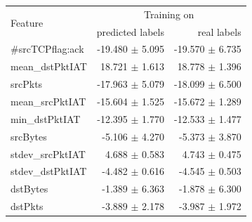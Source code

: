 \documentclass[10pt,sigconf,letterpaper]{acmart}
\begin{document}
\begin{table}
\begin{tabular}{l r r}
\bottomrule
\end{tabular} \qquad
 \begin{tabular}{l r r} \toprule 
\multirow{2}{*}{Feature} & \multicolumn{2}{c}{Training on} \\
  & predicted labels & real labels \\ \midrule
    \#srcTCPflag:ack &  -19.480 $\pm$ 5.095 &  -19.570 $\pm$ 6.735 \\
     mean\_dstPktIAT &   18.721 $\pm$ 1.613 &   18.778 $\pm$ 1.396 \\
             srcPkts &  -17.963 $\pm$ 5.079 &  -18.099 $\pm$ 6.500 \\
     mean\_srcPktIAT &  -15.604 $\pm$ 1.525 &  -15.672 $\pm$ 1.289 \\
      min\_dstPktIAT &  -12.395 $\pm$ 1.770 &  -12.533 $\pm$ 1.477 \\
            srcBytes &   -5.106 $\pm$ 4.270 &   -5.373 $\pm$ 3.870 \\
    stdev\_srcPktIAT &    4.688 $\pm$ 0.583 &    4.743 $\pm$ 0.475 \\
    stdev\_dstPktIAT &   -4.482 $\pm$ 0.616 &   -4.545 $\pm$ 0.503 \\
            dstBytes &   -1.389 $\pm$ 6.363 &   -1.878 $\pm$ 6.300 \\
             dstPkts &   -3.889 $\pm$ 2.178 &   -3.987 $\pm$ 1.972 \\

\end{tabular}
\end{table}
\end{document}
